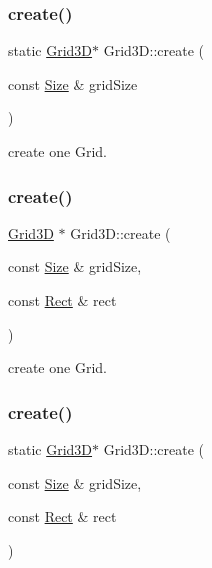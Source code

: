 \subsubsection{\texorpdfstring{create()}{create()}\hspace{0.1cm}{\footnotesize\ttfamily [2/8]}}
{\footnotesize\ttfamily static \hyperlink{classGrid3D}{Grid3D}$\ast$ Grid3\+D\+::create (\begin{DoxyParamCaption}\item[{const \hyperlink{classSize}{Size} \&}]{grid\+Size }\end{DoxyParamCaption})\hspace{0.3cm}{\ttfamily [static]}}

create one Grid. \mbox{\label{classGrid3D_ad21f7a65ec26387d56385194510b47cb}} 
\subsubsection{\texorpdfstring{create()}{create()}\hspace{0.1cm}{\footnotesize\ttfamily [3/8]}}
{\footnotesize\ttfamily \hyperlink{classGrid3D}{Grid3D} $\ast$ Grid3\+D\+::create (\begin{DoxyParamCaption}\item[{const \hyperlink{classSize}{Size} \&}]{grid\+Size,  }\item[{const \hyperlink{classRect}{Rect} \&}]{rect }\end{DoxyParamCaption})\hspace{0.3cm}{\ttfamily [static]}}

create one Grid. \mbox{\label{classGrid3D_afca4a306149283f050daf6a1bd29ec95}} 
\subsubsection{\texorpdfstring{create()}{create()}\hspace{0.1cm}{\footnotesize\ttfamily [4/8]}}
{\footnotesize\ttfamily static \hyperlink{classGrid3D}{Grid3D}$\ast$ Grid3\+D\+::create (\begin{DoxyParamCaption}\item[{const \hyperlink{classSize}{Size} \&}]{grid\+Size,  }\item[{const \hyperlink{classRect}{Rect} \&}]{rect }\end{DoxyParamCaption})\hspace{0.3cm}{\ttfamily [static]}}

